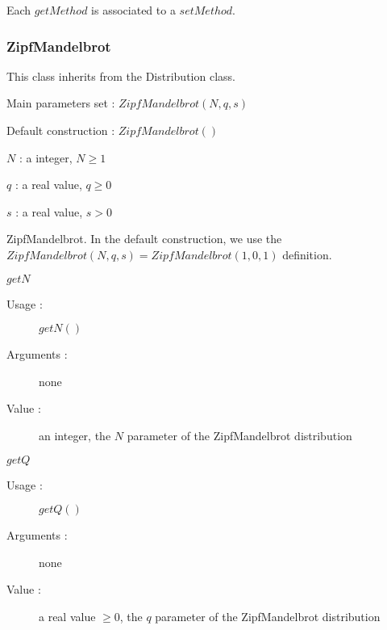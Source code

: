 Each  $getMethod$  is associated to a $setMethod$.



\newpage \subsubsection{ZipfMandelbrot}

This class inherits from the Distribution class.

\begin{description}

\item[Usage :] \rule{0pt}{1em}
  \begin{description}
  \item Main parameters set : $ZipfMandelbrot(N,q,s)$
  \item Default construction : $ZipfMandelbrot( )$
  \end{description}

\item[Arguments :]  \rule{0pt}{1em}
  \begin{description}
  \item $N$ : a   integer, $N \geq 1$
  \item $q$ : a real value, $q \geq 0$
  \item $s$ : a real value, $s > 0$
  \end{description}

\item[Value :]  ZipfMandelbrot. In the default construction, we use the $ZipfMandelbrot(N,q,s) = ZipfMandelbrot(1,0,1)$ definition.

\item[Some methods :] \rule{0pt}{1em}
  \begin{description}

  \item $getN$
    \begin{description}
    \item[Usage :] $getN()$
    \item[Arguments :] none
    \item[Value :]  an integer,  the $N$ parameter of the ZipfMandelbrot distribution
    \end{description}
    \bigskip

  \item $getQ$
    \begin{description}
    \item[Usage :] $getQ()$
    \item[Arguments :] none
    \item[Value :]  a real value $\geq 0$,  the $q$ parameter of the ZipfMandelbrot distribution
    \end{description}
    \bigskip


\end{description}
\end{description}
